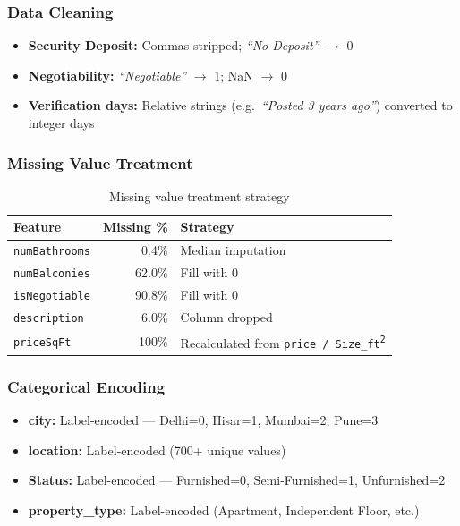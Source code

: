 \documentclass[12pt,a4paper]{article}
\newcommand{\TH}[1]{\cellcolor{TblHead}\color{white}\sffamily\bfseries\small #1}
\newcommand{\RA}{\cellcolor{RowA}}
\newcommand{\RB}{\cellcolor{RowB}}
\begin{document}
\subsubsection{Data Cleaning}
\begin{itemize}
  \item \textbf{Security Deposit:} Commas stripped; \textit{``No Deposit''} $\to$ 0
  \item \textbf{Negotiability:} \textit{``Negotiable''} $\to$ 1; NaN $\to$ 0
  \item \textbf{Verification days:} Relative strings (e.g.\ \textit{``Posted 3 years ago''})
        converted to integer days
\end{itemize}

\subsubsection{Missing Value Treatment}
\begin{table}[H]\centering
  \caption{Missing value treatment strategy}
  \begin{tabular}{lrl}
    \toprule
    \TH{Feature} & \TH{Missing \%} & \TH{Strategy} \\
    \midrule
    \RA\texttt{numBathrooms} & 0.4\%  & Median imputation \\
    \RB\texttt{numBalconies} & 62.0\% & Fill with 0 \\
    \RA\texttt{isNegotiable} & 90.8\% & Fill with 0 \\
    \RB\texttt{description}  & 6.0\%  & Column dropped \\
    \RA\texttt{priceSqFt}    & 100\%  & Recalculated from \texttt{price / Size\_ft\textsuperscript{2}} \\
    \bottomrule
  \end{tabular}
\end{table}

\subsubsection{Categorical Encoding}
\begin{itemize}
  \item \textbf{city:} Label-encoded --- Delhi=0, Hisar=1, Mumbai=2, Pune=3
  \item \textbf{location:} Label-encoded (700+ unique values)
  \item \textbf{Status:} Label-encoded --- Furnished=0, Semi-Furnished=1, Unfurnished=2
  \item \textbf{property\_type:} Label-encoded (Apartment, Independent Floor, etc.)
\end{itemize}
\end{document}
